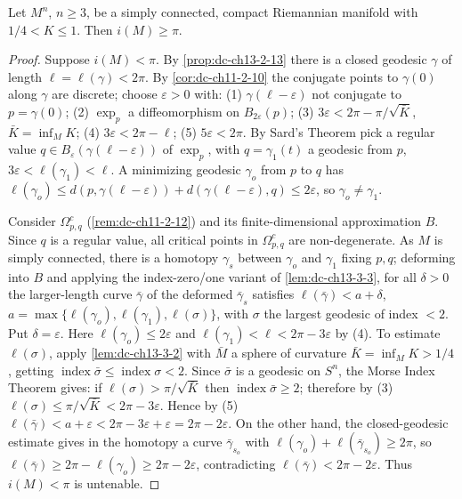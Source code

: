 \begin{proposition}
  \label{prop:dc-ch13-3-1}
  Let $M^n$, $n\geq 3$, be a simply connected, compact Riemannian manifold with
  $1/4<K\leq 1$. Then $i(M)\geq\pi$.
\end{proposition}
\begin{proof}
  \sketch
  Suppose $i(M)<\pi$. By \cref{prop:dc-ch13-2-13} there is a
  closed geodesic $\gamma$ of length $\ell=\ell(\gamma)<2\pi$. By \cref{cor:dc-ch11-2-10} the conjugate points to $\gamma(0)$ along $\gamma$ are discrete; choose
  $\varepsilon>0$ with: (1) $\gamma(\ell-\varepsilon)$ not conjugate to $p=\gamma(0)$;
  (2) $\exp_p$ a diffeomorphism on $B_{2\varepsilon}(p)$;
  (3) $3\varepsilon<2\pi-\pi/\sqrt{\bar K}$, $\bar K=\inf_M K$;
  (4) $3\varepsilon<2\pi-\ell$; (5) $5\varepsilon<2\pi$. By Sard's Theorem pick a
  regular value $q\in B_\varepsilon(\gamma(\ell-\varepsilon))$ of $\exp_p$, with
  $q=\gamma_1(t)$ a geodesic from $p$, $3\varepsilon<\ell(\gamma_1)<\ell$. A
  minimizing geodesic $\gamma_o$ from $p$ to $q$ has
  $\ell(\gamma_o)\leq d(p,\gamma(\ell-\varepsilon))+d(\gamma(\ell-\varepsilon),q)\leq 2\varepsilon$,
  so $\gamma_o\neq\gamma_1$.

  Consider $\Omega_{p,q}^c$ (\cref{rem:dc-ch11-2-12}) and its finite-dimensional
  approximation $B$. Since $q$ is a regular value, all critical points in
  $\Omega_{p,q}^c$ are non-degenerate. As $M$ is simply connected, there is a homotopy
  $\gamma_s$ between $\gamma_o$ and $\gamma_1$ fixing $p,q$; deforming into $B$ and
  applying the index-zero/one variant of \cref{lem:dc-ch13-3-3}, for all
  $\delta>0$ the larger-length curve
  $\bar\gamma$ of the deformed $\bar\gamma_s$ satisfies $\ell(\bar\gamma)<a+\delta$,
  $a=\max\{\ell(\gamma_o),\ell(\gamma_1),\ell(\sigma)\}$, with $\sigma$ the largest
  geodesic of index $<2$. Put $\delta=\varepsilon$. Here $\ell(\gamma_o)\leq2\varepsilon$
  and $\ell(\gamma_1)<\ell<2\pi-3\varepsilon$ by (4). To estimate $\ell(\sigma)$, apply
  \cref{lem:dc-ch13-3-2} with $\bar M$ a sphere of curvature $\bar K=\inf_M K>1/4$, getting
  $\operatorname{index}\bar\sigma\leq\operatorname{index}\sigma<2$. Since $\bar\sigma$
  is a geodesic on $S^n$, the Morse Index Theorem gives: if
  $\ell(\sigma)>\pi/\sqrt{\bar K}$ then $\operatorname{index}\bar\sigma\geq2$;
  therefore by (3) $\ell(\sigma)\leq\pi/\sqrt{\bar K}<2\pi-3\varepsilon$. Hence by (5)
  $\ell(\bar\gamma)<a+\varepsilon<2\pi-3\varepsilon+\varepsilon=2\pi-2\varepsilon$.
  On the other hand, the closed-geodesic estimate gives in the
  homotopy a curve $\bar\gamma_{s_o}$ with $\ell(\gamma_o)+\ell(\bar\gamma_{s_o})\geq2\pi$,
  so $\ell(\bar\gamma)\geq2\pi-\ell(\gamma_o)\geq2\pi-2\varepsilon$, contradicting
  $\ell(\bar\gamma)<2\pi-2\varepsilon$. Thus $i(M)<\pi$ is untenable.
\end{proof}

